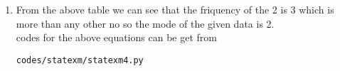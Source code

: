 \renewcommand{\theequation}{\theenumi}
\begin{enumerate}[label=\arabic*.,ref=\thesubsection.\theenumi]
\item From the above table we can see that the friquency of the  2 is 3 which is more than any other no so the mode of the given data is 2.\\
codes for the above equations can be get from
\begin{lstlisting}
codes/statexm/statexm4.py
\end{lstlisting}
\end{enumerate}